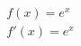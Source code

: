\documentclass[preview]{standalone}
\begin{document}
\begin{align*}
f(x) = e^x \\ f'(x) = e^x
\end{align*}
\end{document}
